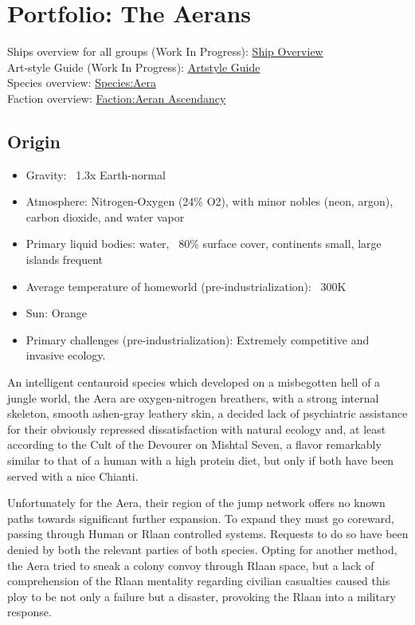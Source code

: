 \section{Portfolio: The Aerans}
Ships overview for all groups (Work In Progress): \href{http://vegastrike.sourceforge.net/wiki/Artstyle\_guide:Overview\_Guide}{Ship Overview} \\
Art-style Guide (Work In Progress): \href{http://vegastrike.sourceforge.net/wiki/Artstyle\_guide:Aeran}{Artstyle Guide} \\
Species overview: \href{http://vegastrike.sourceforge.net/wiki/Species:Aera}{Species:Aera} \\
Faction overview: \href{http://vegastrike.sourceforge.net/wiki/Faction:Aera}{Faction:Aeran Ascendancy}

\subsection{Origin}
\begin{itemize}
\item Gravity: ~1.3x Earth-normal

\item Atmosphere: Nitrogen-Oxygen (24\% O2), with minor nobles (neon, argon), carbon dioxide, and water vapor

\item Primary liquid bodies: water, ~80\% surface cover, continents small, large islands frequent

\item Average temperature of homeworld (pre-industrialization): ~300K

\item Sun: Orange

\item Primary challenges (pre-industrialization): Extremely competitive and invasive ecology.
\end{itemize}

 An intelligent centauroid species which developed on a misbegotten
hell of a jungle world, the Aera are oxygen-nitrogen breathers, with a
strong internal skeleton, smooth ashen-gray leathery skin, a decided
lack of psychiatric assistance for their obviously repressed
dissatisfaction with natural ecology and, at least according to the
Cult of the Devourer on Mishtal Seven, a flavor remarkably similar to
that of a human with a high protein diet, but only if both have been
served with a nice Chianti.

Unfortunately for the Aera, their region of the jump network offers no
known paths towards significant further expansion. To expand they must
go coreward, passing through Human or Rlaan controlled
systems. Requests to do so have been denied by both the relevant
parties of both species. Opting for another method, the Aera tried to
sneak a colony convoy through Rlaan space, but a lack of comprehension
of the Rlaan mentality regarding civilian casualties caused this ploy
to be not only a failure but a disaster, provoking the Rlaan into a
military response.

